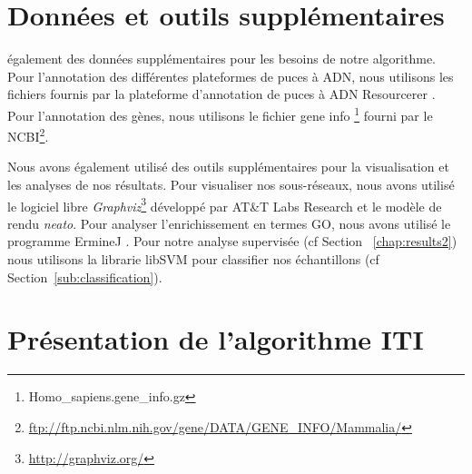 	\section{\textcolor{green!45!black}{Données et outils supplémentaires}}\label{sec:outils}
		 également des données supplémentaires pour les besoins de notre algorithme.
			Pour l'annotation des différentes plateformes de puces à \acs{ADN}, nous utilisons les fichiers fournis par la plateforme d'annotation de puces à \acs{ADN} Resourcerer \citep{Tsai2001}.
			Pour l'annotation des gènes, nous utilisons le fichier gene info \footnote{Homo\_sapiens.gene\_info.gz} fourni par le \acs{NCBI}\footnote{\url{ftp://ftp.ncbi.nlm.nih.gov/gene/DATA/GENE_INFO/Mammalia/}}.

			Nous avons également utilisé des outils supplémentaires pour la visualisation et les analyses de nos résultats.
			Pour visualiser nos sous-réseaux, nous avons utilisé le logiciel libre \emph{Graphviz}\footnote{\url{http://graphviz.org/}} développé par AT\&T Labs Research \citep{Graphviz1988} et le modèle de rendu \emph{neato}.
			Pour analyser l'enrichissement en termes \acs{GO}, nous avons utilisé le programme ErmineJ \citep{Gillis2010}.
			Pour notre analyse supervisée (cf Section ~\ref{chap:results2}) nous utilisons la librarie libSVM \citep{Chang2007} pour classifier nos échantillons (cf Section~\ref{sub:classification}).

	\section{\textcolor{green!45!black}{Présentation de l'algorithme ITI}}\label{sec:ITI}

